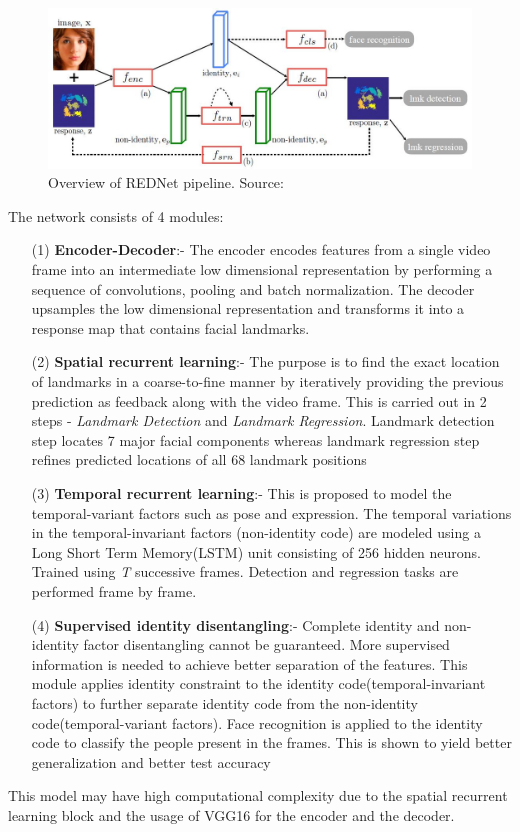 \documentclass{llncs}
\begin{document}
	\begin{figure}
		\centering
		\includegraphics[scale=0.5]{Media/rednet_architecture}
		\vspace{-3mm}
		\caption{Overview of REDNet pipeline. Source:\cite{rednet}}
		\label{rednet_architecture}
		\vspace{-3mm}
	\end{figure}
	
	The network consists of 4 modules:
	\begin{itemize}
		\item[(1)] \textbf{Encoder-Decoder}:-
		The encoder encodes features from a single video frame into an intermediate low dimensional representation by performing a sequence of convolutions, pooling and batch normalization. The decoder upsamples the low dimensional representation and transforms it into a response map that contains facial landmarks.
		\item[(2)] \textbf{Spatial recurrent learning}:-
		The purpose is to find the exact location of landmarks in a coarse-to-fine manner by iteratively providing the previous prediction as feedback along with the video frame. This is carried out in 2 steps - \textit{Landmark Detection} and \textit{Landmark Regression}. Landmark detection step locates 7 major facial components whereas landmark regression step refines predicted locations of all 68 landmark positions
		\item[(3)] \textbf{Temporal recurrent learning}:-
		This is proposed to model the temporal-variant factors such as pose and expression. The temporal variations in the temporal-invariant factors (non-identity code) are modeled using a Long Short Term Memory(LSTM) unit consisting of 256 hidden neurons.
		Trained using \textit{T} successive frames. Detection and regression tasks are performed frame by frame.
		\item[(4)] \textbf{Supervised identity disentangling}:-
		Complete identity and non-identity factor disentangling cannot be guaranteed. More supervised information is needed to achieve better separation of the features. This module applies identity constraint to the identity code(temporal-invariant factors) to further separate identity code from the non-identity code(temporal-variant factors). Face recognition is applied to the identity code to classify the people present in the frames. This is shown to yield better generalization and better test accuracy\\
	\end{itemize}
	This model may have high computational complexity due to the spatial recurrent learning block and the usage of VGG16 for the encoder and the decoder.
	
\end{document}
